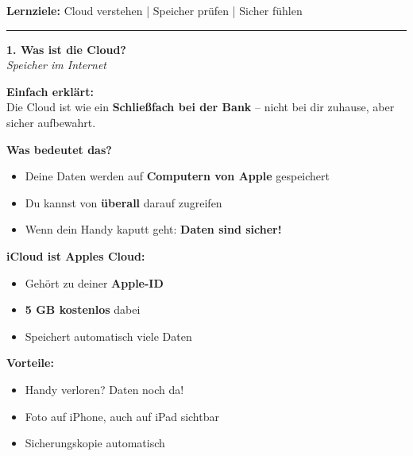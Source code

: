 \documentclass[a4paper,landscape,8pt]{extarticle}
\begin{document}

 \hfill
{\footnotesize\textbf{Lernziele:} Cloud verstehen | Speicher prüfen | Sicher fühlen}

\vspace{1mm}
\hrule
\vspace{1mm}

\begin{minipage}[t]{0.32\linewidth}
\begin{center}
\colorbox{cloudblue!15}{%
\begin{minipage}{0.95\linewidth}
\vspace{2mm}
\begin{center}
{\Large\bfseries\textcolor{cloudblue}{1. Was ist die Cloud?}}\\[1pt]
{\footnotesize\itshape Speicher im Internet}
\end{center}
\vspace{2mm}
\end{minipage}%
}
\end{center}

\vspace{1mm}

\textbf{Einfach erklärt:}\\
Die Cloud ist wie ein \textbf{Schließfach bei der Bank} -- nicht bei dir zuhause, aber sicher aufbewahrt.

\textbf{Was bedeutet das?}
\begin{itemize}
\item Deine Daten werden auf \textbf{Computern von Apple} gespeichert
\item Du kannst von \textbf{überall} darauf zugreifen
\item Wenn dein Handy kaputt geht: \textbf{Daten sind sicher!}
\end{itemize}

\textbf{iCloud ist Apples Cloud:}
\begin{itemize}
\item Gehört zu deiner \textbf{Apple-ID}
\item \textbf{5 GB kostenlos} dabei
\item Speichert automatisch viele Daten
\end{itemize}

\textbf{Vorteile:}
\begin{itemize}
\item Handy verloren? Daten noch da!
\item Foto auf iPhone, auch auf iPad sichtbar
\item Sicherungskopie automatisch
\end{itemize}

\end{minipage}%
\end{document}

